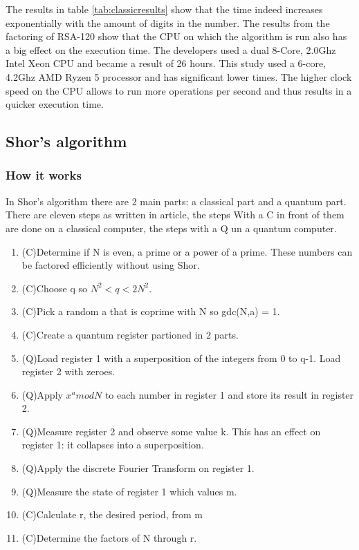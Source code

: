 The results in table \ref{tab:classicresults} show that the time indeed increases exponentially with the amount of digits in the number. The results from the factoring of RSA-120 show that the CPU on which the algorithm is run also has a big effect on the execution time.
The developers used a dual 8-Core, 2.0Ghz Intel Xeon CPU and became a result of 26 hours. This study used a 6-core, 4.2Ghz AMD Ryzen 5 processor and has significant lower times.
The higher clock speed on the CPU allows to run more operations per second and thus results in a quicker execution time.


\subsection{Shor's algorithm}
\subsubsection{How it works}
In Shor's algorithm there are 2 main parts: a classical part and a quantum part.
There are eleven steps as written in \textcite{shor_step} article, the steps With a C in front of them are done on a classical computer, the steps with a Q un a quantum computer.
\begin{enumerate}
    \item (C)Determine if N is even, a prime or a power of a prime. These numbers can be factored efficiently without using Shor. 
    \item (C)Choose q so $N^2<q<2N^2$.
    \item (C)Pick a random a that is coprime with N so gdc(N,a) = 1.
    \item (C)Create a quantum register partioned in 2 parts.
    \item (Q)Load register 1 with a superposition of the integers from 0 to q-1. Load register 2 with zeroes.
    \item (Q)Apply $x^a mod N$ to each number in register 1 and store its result in register 2.
    \item (Q)Measure register 2 and observe some value k. This has an effect on register 1: it collapses into a superposition.
    \item (Q)Apply the discrete Fourier Transform on register 1.
    \item (Q)Measure the state of register 1 which values m.
    \item (C)Calculate r, the desired period, from m
    \item (C)Determine the factors of N through r.

\end{enumerate}
